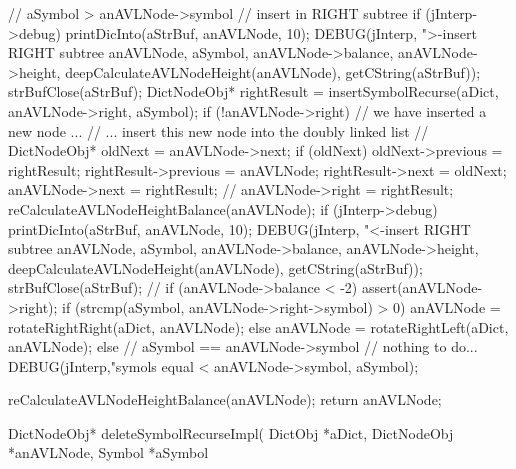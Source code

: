 {{    // aSymbol > anAVLNode->symbol // insert in RIGHT subtree
    if (jInterp->debug) {
      printDicInto(aStrBuf, anAVLNode, 10);
      DEBUG(jInterp, ">-insert RIGHT subtree %
          anAVLNode, aSymbol, anAVLNode->balance,
          anAVLNode->height, deepCalculateAVLNodeHeight(anAVLNode),
          getCString(aStrBuf));
      strBufClose(aStrBuf);
    }
    DictNodeObj* rightResult =
      insertSymbolRecurse(aDict, anAVLNode->right, aSymbol);
    if (!anAVLNode->right) {
      // we have inserted a new node ...
      // ... insert this new node into the doubly linked list
      //
      DictNodeObj* oldNext           = anAVLNode->next;
      if (oldNext) oldNext->previous = rightResult;
      rightResult->previous          = anAVLNode;
      rightResult->next              = oldNext;
      anAVLNode->next                = rightResult;
      //
    }
    anAVLNode->right = rightResult;
    reCalculateAVLNodeHeightBalance(anAVLNode);
    if (jInterp->debug) {
      printDicInto(aStrBuf, anAVLNode, 10);
      DEBUG(jInterp, "<-insert RIGHT subtree %
          anAVLNode, aSymbol, anAVLNode->balance,
          anAVLNode->height, deepCalculateAVLNodeHeight(anAVLNode),
          getCString(aStrBuf));
      strBufClose(aStrBuf);
    }
    //
    if (anAVLNode->balance < -2) {
      assert(anAVLNode->right);
      if (strcmp(aSymbol, anAVLNode->right->symbol) > 0) {
        anAVLNode = rotateRightRight(aDict, anAVLNode);
      } else {
        anAVLNode = rotateRightLeft(aDict, anAVLNode);
      }
    }
  } else {
    // aSymbol == anAVLNode->symbol // nothing to do...
    DEBUG(jInterp,"symols equal <%
          anAVLNode->symbol, aSymbol);
  }

  reCalculateAVLNodeHeightBalance(anAVLNode);
  return anAVLNode;
}
DictNodeObj* deleteSymbolRecurseImpl(
  DictObj     *aDict,
  DictNodeObj *anAVLNode,
  Symbol      *aSymbol
